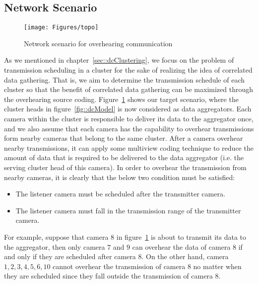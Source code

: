 \subsection{Network Scenario}
\label{sec::networkScenario}
%
\begin{figure}
\centering
\texttt{[image: Figures/topo]}
\caption{\label{fig::sysModel}Network scenario for overhearing communication}
\end{figure}
%
As we mentioned in chapter~\ref{sec::dcClustering}, we focus on the problem of transmission scheduling in a cluster for the sake of realizing the idea of correlated data gathering.
That is, we aim to determine the transmission schedule of each cluster so that the benefit of correlated data gathering can be maximized through the overhearing source coding.
Figure~\ref{fig::sysModel} shows our target scenario, where the cluster heads in figure~\ref{fig::dcModel} is now considered as data aggregators.
Each camera within the cluster is responsible to deliver its data to the aggregator once, and we also assume that each camera has the capability to overhear transmissions form nearby cameras that belong to the same cluster.
After a camera overhear nearby transmissions, it can apply some multiview coding technique to reduce the amount of data that is required to be delivered to the data aggregator (i.e. the serving cluster head of this camera).
In order to overhear the transmission from nearby cameras, it is clearly that the below two condition must be satisfied:
\begin{itemize}
\item The listener camera must be scheduled after the transmitter camera.
\item The listener camera must fall in the transmission range of the transmitter camera.
\end{itemize}
For example, suppose that camera $8$ in figure~\ref{fig::sysModel} is about to transmit its data to the aggregator, then only camera $7$ and $9$ can overhear the data of camera $8$ if and only if they are scheduled after camera $8$.
On the other hand, camera ${1,2,3,4,5,6,10}$ cannot overhear the transmission of camera $8$ no matter when they are scheduled since they fall outside the transmission of camera $8$.